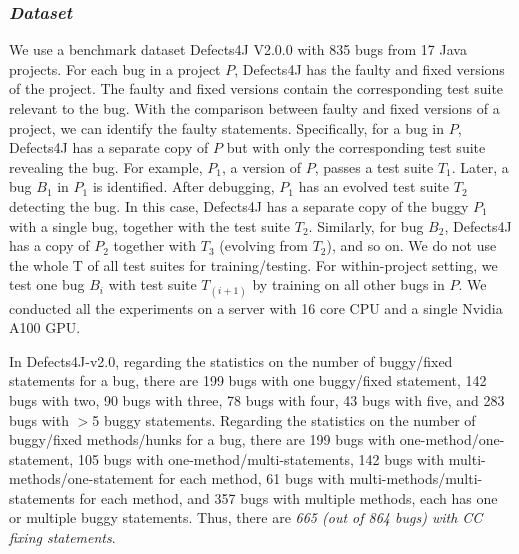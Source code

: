 \subsubsection{\bf {\em Dataset}}


We use a benchmark dataset Defects4J V2.0.0 \cite{defects4j} with 835
bugs from 17 Java projects. For each bug in a project $P$, Defects4J
has the faulty and fixed versions of the project. The faulty and fixed
versions contain the corresponding test suite relevant to the
bug. With the  comparison between faulty and fixed versions
of a project, we can identify the faulty statements. Specifically, for
a bug in $P$, Defects4J has a separate copy of $P$ but with only the
corresponding test suite revealing the bug. For example, $P_1$, a
version of $P$, passes a test suite $T_1$. Later, a bug $B_1$ in $P_1$
is identified. After debugging, $P_1$ has an evolved test suite $T_2$
detecting the bug. In this case, Defects4J has a separate copy of the
buggy $P_1$ with a single bug, together with the test suite
$T_2$. Similarly, for bug $B_2$, Defects4J has a copy of $P_2$
together with $T_3$ (evolving from $T_2$), and so on. We do not use
the whole T of all test suites for training/testing. For
within-project setting, we test one bug $B_i$ with test suite
$T_{(i+1)}$ by training on all other bugs in $P$. We conducted all the
experiments on a server with 16 core CPU and a single Nvidia A100 GPU.

In Defects4J-v2.0, regarding the statistics on the number of
buggy/fixed statements for a bug, there are 199 bugs with one
buggy/fixed statement, 142 bugs with two, 90 bugs with three, 78 bugs
with four, 43 bugs with five, and 283 bugs with $>$5 buggy
statements. Regarding the statistics on the number of buggy/fixed
methods/hunks for a bug,
there are 199 bugs with one-method/one-statement, 105 bugs with
one-method/multi-statements, 142 bugs with multi-methods/one-statement
for each method, 61 bugs with multi-methods/multi-statements for each
method, and 357 bugs with multiple methods, each has one or multiple
buggy statements. Thus, there are {\em 665 (out of 864 bugs) with CC
fixing statements}.





	
